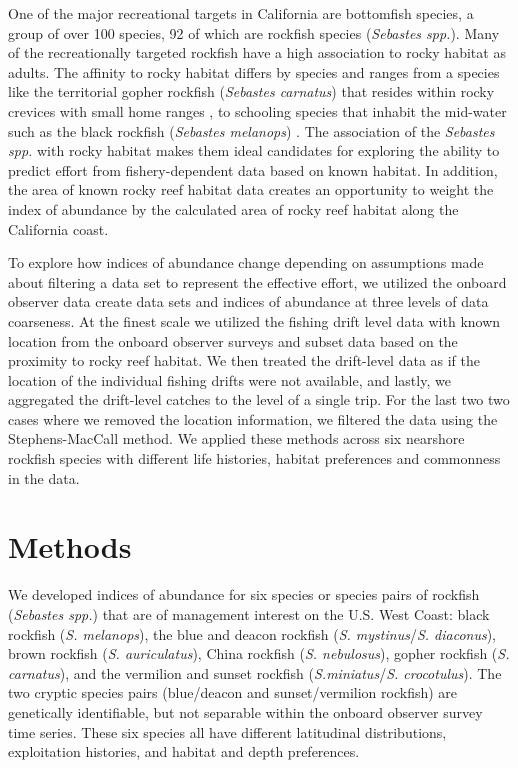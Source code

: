 \documentclass[
  12pt,
  authoryear,
  preprint,
  3p]{elsarticle}
\begin{document}
One of the major recreational targets in California are bottomfish
species, a group of over 100 species, 92 of which are rockfish species
(\emph{Sebastes spp.}). Many of the recreationally targeted rockfish
have a high association to rocky habitat as adults. The affinity to
rocky habitat differs by species and ranges from a species like the
territorial gopher rockfish (\emph{Sebastes carnatus}) that resides
within rocky crevices with small home ranges \citep{Larson:1980:TBB}, to
schooling species that inhabit the mid-water such as the black rockfish
(\emph{Sebastes melanops}) \citep{Love:1990:LHA}. The association of the
\emph{Sebastes spp.} with rocky habitat makes them ideal candidates for
exploring the ability to predict effort from fishery-dependent data
based on known habitat. In addition, the area of known rocky reef
habitat data creates an opportunity to weight the index of abundance by
the calculated area of rocky reef habitat along the California coast.

To explore how indices of abundance change depending on assumptions made
about filtering a data set to represent the effective effort, we
utilized the onboard observer data create data sets and indices of
abundance at three levels of data coarseness. At the finest scale we
utilized the fishing drift level data with known location from the
onboard observer surveys and subset data based on the proximity to rocky
reef habitat. We then treated the drift-level data as if the location of
the individual fishing drifts were not available, and lastly, we
aggregated the drift-level catches to the level of a single trip. For
the last two two cases where we removed the location information, we
filtered the data using the Stephens-MacCall method. We applied these
methods across six nearshore rockfish species with different life
histories, habitat preferences and commonness in the data.

\hypertarget{methods}{%
\section{Methods}\label{methods}}

We developed indices of abundance for six species or species pairs of
rockfish (\emph{Sebastes spp.}) that are of management interest on the
U.S. West Coast: black rockfish (\emph{S. melanops}), the blue and
deacon rockfish (\emph{S. mystinus}/\emph{S. diaconus}), brown rockfish
(\emph{S. auriculatus}), China rockfish (\emph{S. nebulosus}), gopher
rockfish (\emph{S. carnatus}), and the vermilion and sunset rockfish
(\emph{S.miniatus}/\emph{S. crocotulus}). The two cryptic species pairs
(blue/deacon and sunset/vermilion rockfish) are genetically
identifiable, but not separable within the onboard observer survey time
series. These six species all have different latitudinal distributions,
exploitation histories, and habitat and depth
preferences\citep{Love:2002:RNP}.
\end{document}
